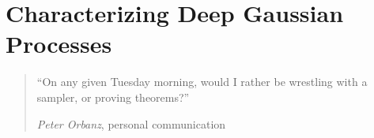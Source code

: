 
\inbpdocument


\chapter{Characterizing Deep Gaussian Processes}
\label{ch:deeplimits}

\begin{quotation}
``On any given Tuesday morning, would I rather be wrestling with a sampler, or proving theorems?''

\hspace*{\fill} \emph{Peter Orbanz}, personal communication
\end{quotation}


